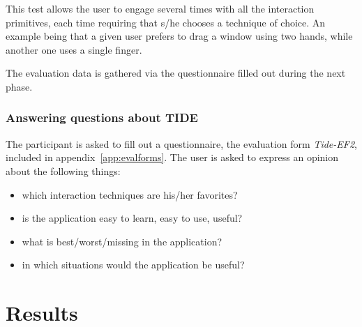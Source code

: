 This test allows the user to engage several times with all the interaction primitives, each time requiring that s/he chooses a technique of choice.
An example being that a given user prefers to drag a window using two hands, while another one uses a single finger.

The evaluation data is gathered via the questionnaire filled out during the next phase.

\subsubsection{Answering questions about TIDE}

The participant is asked to fill out a questionnaire, the evaluation form \emph{Tide-EF2}, included in appendix~\ref{app:evalforms}.
The user is asked to express an opinion about the following things:
\begin{itemize}
\item which interaction techniques are his/her favorites?
\item is the application easy to learn, easy to use, useful?
\item what is best/worst/missing in the application?
\item in which situations would the application be useful? 
\end{itemize}



\clearpage
\section{Results}
\label{sec:results}

